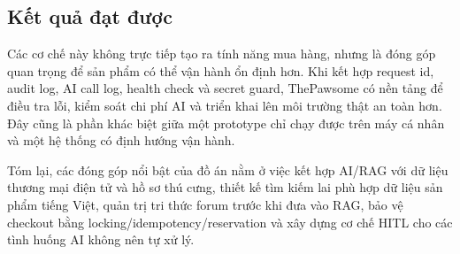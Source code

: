 \documentclass[../DoAn.tex]{subfiles}
\begin{document}
\subsection{Kết quả đạt được}
\label{subsection:5.5.3}

Các cơ chế này không trực tiếp tạo ra tính năng mua hàng, nhưng là đóng góp quan trọng để sản phẩm có thể vận hành ổn định hơn. Khi kết hợp request id, audit log, AI call log, health check và secret guard, ThePawsome có nền tảng để điều tra lỗi, kiểm soát chi phí AI và triển khai lên môi trường thật an toàn hơn. Đây cũng là phần khác biệt giữa một prototype chỉ chạy được trên máy cá nhân và một hệ thống có định hướng vận hành.

Tóm lại, các đóng góp nổi bật của đồ án nằm ở việc kết hợp AI/RAG với dữ liệu thương mại điện tử và hồ sơ thú cưng, thiết kế tìm kiếm lai phù hợp dữ liệu sản phẩm tiếng Việt, quản trị tri thức forum trước khi đưa vào RAG, bảo vệ checkout bằng locking/idempotency/reservation và xây dựng cơ chế HITL cho các tình huống AI không nên tự xử lý.
\end{document}
